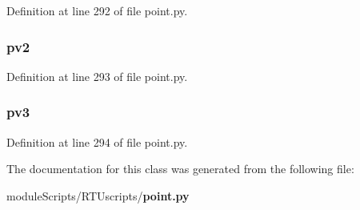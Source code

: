 Definition at line 292 of file point.\+py.

\subsubsection[{pv2}]{\setlength{\rightskip}{0pt plus 5cm}pv2}\label{classpoint_1_1_point_view_test_a303546d8e323b40bda51c50e128d884b}


Definition at line 293 of file point.\+py.

\subsubsection[{pv3}]{\setlength{\rightskip}{0pt plus 5cm}pv3}\label{classpoint_1_1_point_view_test_a35f58269d9408707e8490c2501fd5c70}


Definition at line 294 of file point.\+py.



The documentation for this class was generated from the following file\+:\begin{DoxyCompactItemize}
\item 
module\+Scripts/\+R\+T\+Uscripts/{\bf point.\+py}\end{DoxyCompactItemize}
